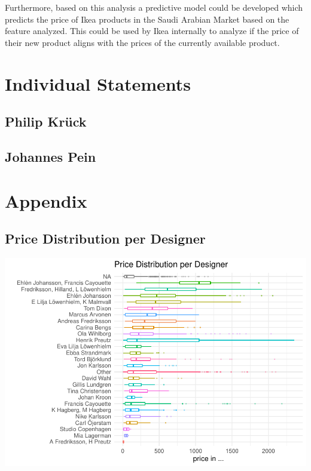 \documentclass[a4paper, nobind]{templates/ociamthesis}
\begin{document}
Furthermore, based on this analysis a predictive model could be developed which predicts the price of Ikea products in the Saudi Arabian Market based on the feature analyzed. This could be used by Ikea internally to analyze if the price of their new product aligns with the prices of the currently available product.

\hypertarget{individual-statements}{%
\chapter{Individual Statements}\label{individual-statements}}

\hypertarget{philip-kruxfcck}{%
\section{Philip Krück}\label{philip-kruxfcck}}

\hypertarget{johannes-pein}{%
\section{Johannes Pein}\label{johannes-pein}}

\startappendices

\hypertarget{appendix}{%
\chapter{Appendix}\label{appendix}}

\hypertarget{price_distribution_designer}{%
\section{Price Distribution per Designer}\label{price_distribution_designer}}

\includegraphics{_main_files/figure-latex/unnamed-chunk-5-1.pdf}
\end{document}
